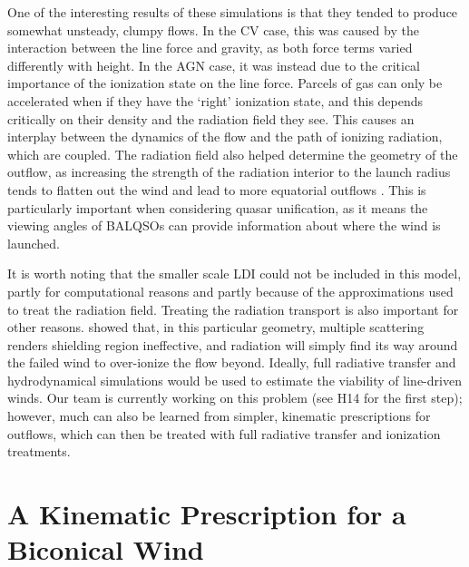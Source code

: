 One of the interesting results of these  simulations is that they tended
to produce somewhat unsteady, clumpy flows. In the CV case, this was caused by
the interaction between the line force and gravity, as both force terms varied 
differently with height. In the AGN case, it was instead due to the critical
importance of the ionization state on the line force. Parcels of gas can only 
be accelerated when if they have the `right' ionization state, and this depends
critically on their density and the radiation field they see. This causes
an interplay between the dynamics of the flow and the path of ionizing radiation, 
which are coupled. The radiation field also helped
determine the geometry of the outflow, as increasing the strength of the radiation
interior to the launch radius tends to flatten out the wind and lead to more
equatorial outflows \citep{proga2005}.
This is particularly important when considering quasar unification, as it means
the viewing angles of BALQSOs can provide information about where the wind is launched.

It is worth noting that the smaller scale LDI could not be included in this model,
partly for computational reasons and partly because of the approximations 
used to treat the radiation field. Treating the radiation transport is also
important for other reasons. 
\citet[][hereafter H14]{H14} showed that, in this particular geometry, 
multiple scattering renders shielding region
ineffective, and radiation will simply find its way around the failed wind
to over-ionize the flow beyond.
Ideally, full radiative transfer and hydrodynamical simulations would be used
to estimate the viability of line-driven winds. Our team is currently working 
on this problem (see H14 for the first step); however, much 
can also be learned from simpler, kinematic prescriptions for outflows, which
can then be treated with full radiative transfer and ionization treatments.  

\section{A Kinematic Prescription for a Biconical Wind}
\label{sec:sv93_model}

